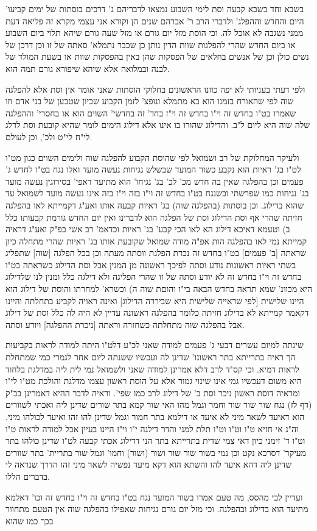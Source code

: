 \documentclass[12pt, openany]{book}
\begin{document}
בשבא וחד בשבא קבעה וסת לימי השבוע נמצאו לדבריהם ג' דרכים בוסתות של ימים קביעו' היום והחדש וההפלג' ולדברי הרב ר' אברהם שנים הן וקורא אני עצמי מקרא זה פליאה דעת ממני נשגבה לא אוכל לה. וכי הוסת מזל יום גורם או מזל שעה גורם שיהא תלוי ביום השבוע או ביום החדש שהרי להפלגות שוות הדין נותן כן שכבר נתמלא' סאתה של זו וכן דרכן של נשים כולן וכן של אנשים בחלאים של הפסקות שהן באין בהפסקות שוות או בשעת המולד של לבנה ובמלואה אלא שיהא שיפורא גורם תמה הוא.\par ולפי דעתי בעניותי לא יפה כוונו הראשונים בחלוקי הוסתות שאני אומר אין וסת אלא להפלגה שוה לפי שהאורח בזמנו הוא בא מתמלא ונופצ' לזמן הקבוע שכיון שטבען של בני אדם וזו שאמרו בט"ו בחדש זה וי"ו בחדש זה וי"ז בחד' זה בחדשי' השוים הוא או בחסרי' וההפלגה שלה שוה היא ליום ל"ב. והדילוג שהורו בו אינו אלא דילוג הימים לומר שהיא קובעת וסת לדלג לי"ח לי"ט ולכ', וכן לעולם.\par  ולעיקר המחלוקת של רב ושמואל לפי שהוסת הקבוע להפלגה שוה ולימים השוים כגון מט"ו לט"ו בג' ראיות הוא נקבע כשור המועד שבשלש נגיחות נעשה מועד ואלו נגח בט"ו לחדש ג' פעמים וכן בהפלגה שאין בה חדש מכ' לכ' בג' נגיחו' הוא מתיעד דאפי' בסירוגין נעשה מועד בג' נגיחות כמו שפרשתי וכשנגח בט"ו בחדש זה וי"ו בזה וי"ז בזה אינו נעשה מועד לשמואל עד שהוא בדילוג. וכן בוסתות (בהפלגה שוה) בג' ראיות קבעה אותו ואע"ג דקמייתא לאו בהפלגה חזיתה שהרי אף וסת הדילוג וסת של הפלגה הוא לדברינו ואין יום החדש גורמת קבעותו כלל ב) וטעמא דאיכא דילוג הא לאו הכי קבע' בג' ראיות וכדאמ' רב אשי בפ"ק ואע"ג דראיה קמייתא נמי לאו בהפלגה הות אפ"ה מודה שמואל שקובעת אותו בג' ראיות שהרי מתחלה כיון שראתה [ב' פעמים] בט"ו בחדש זה נכרת הפלגת ווסתה מעתה וכן בכל הפלגה [שוה] שתפליג בשתי ראיות ראשונות נודע וסתה לפיכך ראשונה מן המנין אבל וסת הדילוג כשראתה בט"ו בחדש זה וי"ו בחדש זה לא יודע וסתה של זו שהרי הפליגה ולא דילגה כלל ומנין לנו שלדילוג היא מכוונ' שמא תראה בחדש הבאה בי"ו והוםת שוה ה) וכשרא' למחרתו והוסת של דילוג הוא היינו שלישית {\small [לפי שראייה שלישית היא שביררה הדילוג]}  ואינה ראויה לקביע בתחלתה והיינו דקאמר קמייתא לא בדילוג חזיתה כלומר בהפלגה ראשונה עדיין לא היה לה כלל וסת של דילוג אבל בהפלגה שוה מתחלתה כשחזרה וראתה [ניכרת ההפלגה] ויודע וסתה.\par [והא דאמרינן] שינתה למיום עשרים דבעי ג' פעמים למודה שאני לכ"ע דלט"ו היתה למודה לראות בקביעות הך ראיה בתרייתא בתר ראשונו' שדינן לה ועכשיו ששנתה ליום אחר לגמרי כמי שמתחלת לראות דמיא. וכי קס"ד לרב דלא אמרינן למודה שאני ולשמואל נמי לית ליה במדלגת בלחוד היא משום דעכשיו גמי אינו שינוי גמור אלא על הוסת ראשון עצמו מדלגת והולכת מט"ו לי"ו ומראיה דוסת ראשון ניכר וסת ב' של דילוג לרב כמו שפי'. וראיה לדבר ההיא דאמרינן בב"ק (דף לז) נגח שור שור שור וחמר וגמל מהו האי שור קמא בתר שורים שדינן ליה ואכתי לשוורים הוא דאיעד לשאר מיני לא איעד או דילמא בתר חמור וגמל שדינן להו זהו ואיעד לכולהו מיני. וה"נ אי חזיא ט"ו וט"ו וט"ו תלת למני והדר דילגה י"ו וי"ז היינו בעיין אבל למודה לראות ט"ו וט"ו ד' זימני כיון דאי צמי שדית בתרייתא בתר הני דדילוג אכתי קבעה לט"ו שדינן כולהו בתר מעיקר' דסרכא נקט וכן נמי בשור שור שור ושור (ושור) וחמו' וגמל שור בתריית' בתר שוורים שדינן ליה דהא איעד להו והשתא הוא דקא מיעד נפשיה לשאר מיני זהו הדרך שנראה לי בדברים הללו.\par  ועדיין לבי מהסס, מה טעם אמרו בשור המועד נגח בט"ו בחדש זה וי"ו בחדש זה וכו' דאלמא מתיעד הוא בדילוג ובהפלגה. וכי מזל יום גורם נגיחות שאפילו בהפלגה שוה אין הטעם מתחוור בכך כמו שהוא 
\end{document}
